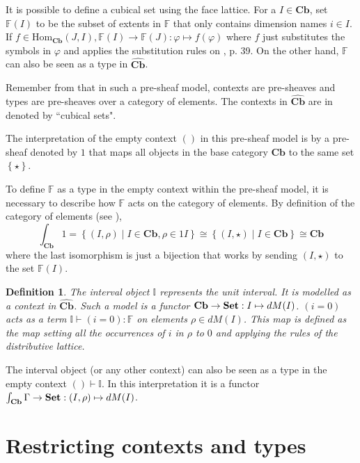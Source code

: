 \documentclass[12pt,a4paper,twoside,xetex]{book} %
\newcommand{\keyword}[1]{\emph{#1}\index{#1}}
\newtheorem{definition}[theorem]{Definition}
\newcommand{\psh}[1]{\widehat{#1}}
\newcommand{\singleton}[0]{\left\{ \star \right\}}
\newcommand{\homo}[3]{\text{Hom}_{#1}\left(#2,#3\right)}
\newcommand{\cube}[0]{\textbf{Cb}}
\begin{document}
It is possible to define a cubical set using the face lattice. For a $I\in 
\cube$, set $\mathbb{F}(I)$ to be the subset of extents in 
$\mathbb{F}$ that only contains dimension names $i \in I$. If $f \in 
\homo{\cube}{J}{I}, \mathbb{F}(I) \rightarrow \mathbb{F}(J): \varphi 
\mapsto f(\varphi)$ where $f$ just substitutes the symbols in $\varphi$ and 
applies the substitution rules on \cite{Orton2019}, p. 39. On the other hand, 
$\mathbb{F}$ can also be seen as a type in $\psh{\cube}$. 

Remember from  that in such a pre-sheaf model, contexts are 
pre-sheaves and types are pre-sheaves over a category of elements. The contexts 
in $\psh{\cube}$ are in  
denoted by ``cubical sets".

The interpretation of the empty context $()$ in this pre-sheaf model is by 
 a pre-sheaf denoted by $1$ that maps all objects in the base 
category $\cube$ to the same set $\singleton$. 

To define $\mathbb{F}$ as a type in the empty context within the pre-sheaf 
model, it is necessary to describe how $\mathbb{F}$ acts on the category of 
elements. By definition of the category of elements (see ), 
$$\int_{\cube} 1 = \left\{ (I, \rho ) \mid I \in \cube, \rho \in 1I 
\right\} \cong \left\{ (I, \star ) \mid I \in \cube \right\}  \cong 
\cube$$ where the last isomorphism is just a bijection that works by 
sending $(I, \star )$ to the set $\mathbb{F}(I)$.


\begin{definition}\label{interval}
The \keyword{interval object} $\mathbb{I}$ represents the unit interval. It is 
modelled as a context in $\psh{\cube}$. Such a model is a functor 
$\cube \rightarrow \set : I \mapsto dM(I)$.  $(i=0)$ acts as a term 
$\mathbb{I} \vdash (i = 0) : \mathbb{F}$ on elements $\rho \in dM (I)$. This 
map is defined as the map setting all the occurrences of $i$ in $\rho$ to $0$ 
and applying the rules of the distributive lattice.
\end{definition}

The interval object (or any other context) can also be seen as a type in the empty context $() \vdash \mathbb{I}$. In this interpretation it is a functor  $\int_{\cube} \Gamma \rightarrow 
\set : (I,\rho) \mapsto dM(I)$.



\section{Restricting contexts and types}
\end{document}
